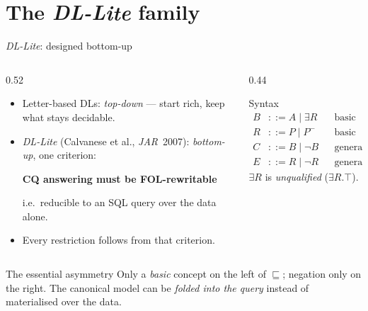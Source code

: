 \documentclass[10pt,aspectratio=169,xcolor=table]{beamer}
\newcommand{\dlliteplain}{\textit{DL-Lite}}
\newcommand{\sub}{\sqsubseteq}
\newcommand{\inv}[1]{#1^{-}}
\newcommand{\hl}[1]{\textcolor{accent}{\textbf{#1}}}
\begin{document}
\section{The \dlliteplain{} family}

\begin{frame}{\dlliteplain: designed bottom-up}
  \begin{columns}[c]
    \begin{column}{0.52\textwidth}
      \small
      \begin{itemize}
        \item Letter-based DLs: \emph{top-down} --- start rich, keep what stays decidable.
        \item \dlliteplain{} (Calvanese et al., \emph{JAR}~2007): \emph{bottom-up}, one criterion:
          \begin{center}
            \hl{CQ answering must be FOL-rewritable}
          \end{center}
          i.e.\ reducible to an SQL query over the data alone.
        \item Every restriction follows from that criterion.
      \end{itemize}
    \end{column}
    \begin{column}{0.44\textwidth}
      \begin{block}{Syntax}
        \footnotesize
        \vspace{-1em}
        \begin{align*}
          B &::= A \mid \exists R  &&\text{basic concept}\\
          R &::= P \mid \inv{P}    &&\text{basic role}\\
          C &::= B \mid \neg B     &&\text{general concept}\\
          E &::= R \mid \neg R     &&\text{general role}
        \end{align*}
        $\exists R$ is \emph{unqualified} ($\exists R.\top$).
      \end{block}
    \end{column}
  \end{columns}
  \vspace{0.5em}
  \begin{alertblock}{The essential asymmetry}
    \small Only a \emph{basic} concept on the left of $\sub$; negation only on the right.
    The canonical model can be \emph{folded into the query} instead of materialised over the data.
  \end{alertblock}
\end{frame}
\end{document}
